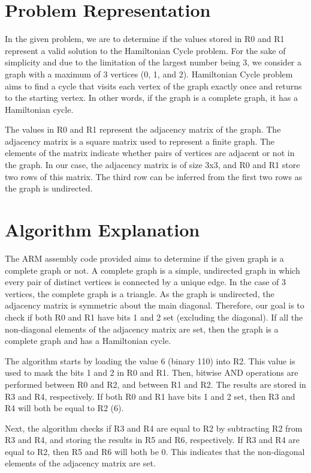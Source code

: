 \section{Problem Representation}

In the given problem, we are to determine if the values stored in R0 and R1 represent a valid solution to the Hamiltonian Cycle problem. For the sake of simplicity and due to the limitation of the largest number being 3, we consider a graph with a maximum of 3 vertices (0, 1, and 2). Hamiltonian Cycle problem aims to find a cycle that visits each vertex of the graph exactly once and returns to the starting vertex. In other words, if the graph is a complete graph, it has a Hamiltonian cycle. 

The values in R0 and R1 represent the adjacency matrix of the graph. The adjacency matrix is a square matrix used to represent a finite graph. The elements of the matrix indicate whether pairs of vertices are adjacent or not in the graph. In our case, the adjacency matrix is of size 3x3, and R0 and R1 store two rows of this matrix. The third row can be inferred from the first two rows as the graph is undirected.

\section{Algorithm Explanation}

The ARM assembly code provided aims to determine if the given graph is a complete graph or not. A complete graph is a simple, undirected graph in which every pair of distinct vertices is connected by a unique edge. In the case of 3 vertices, the complete graph is a triangle. As the graph is undirected, the adjacency matrix is symmetric about the main diagonal. Therefore, our goal is to check if both R0 and R1 have bits 1 and 2 set (excluding the diagonal). If all the non-diagonal elements of the adjacency matrix are set, then the graph is a complete graph and has a Hamiltonian cycle.

The algorithm starts by loading the value 6 (binary 110) into R2. This value is used to mask the bits 1 and 2 in R0 and R1. Then, bitwise AND operations are performed between R0 and R2, and between R1 and R2. The results are stored in R3 and R4, respectively. If both R0 and R1 have bits 1 and 2 set, then R3 and R4 will both be equal to R2 (6).

Next, the algorithm checks if R3 and R4 are equal to R2 by subtracting R2 from R3 and R4, and storing the results in R5 and R6, respectively. If R3 and R4 are equal to R2, then R5 and R6 will both be 0. This indicates that the non-diagonal elements of the adjacency matrix are set.

